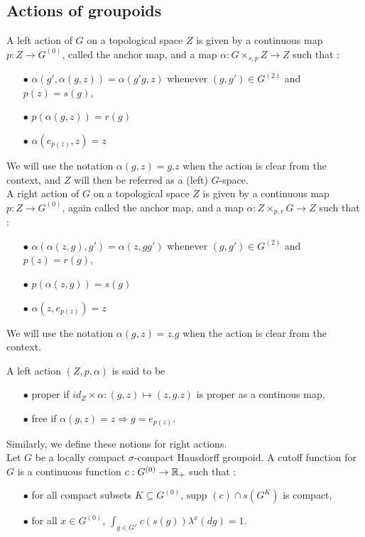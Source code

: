 \subsection{Actions of groupoids}

\begin{definition}
A left action of $G$ on a topological space $Z$ is given by a continuous map $p : Z \rightarrow G^{(0)}$, called the anchor map, and a map $\alpha : G\times_{s,p} Z \rightarrow Z $ such that :
\begin{itemize}
\item[$\bullet$] $\alpha(g',\alpha(g,z)) = \alpha(g'g,z)$ whenever $(g,g')\in G^{(2)}$ and $p(z)=s(g)$,
\item[$\bullet$] $p(\alpha(g,z))= r(g)$
\item[$\bullet$] $\alpha(e_{p(z)},z)=z$
\end{itemize} 
We will use the notation $\alpha(g,z) = g.z$ when the action is clear from the context, and $Z$ will then be referred as a (left) $G$-space.\\

A right action of $G$ on a topological space $Z$ is given by a continuous map $p : Z \rightarrow G^{(0)}$, again called the anchor map, and a map $\alpha : Z\times_{p,r} G \rightarrow Z $ such that :
\begin{itemize}
\item[$\bullet$] $\alpha(\alpha(z,g),g') = \alpha(z, gg')$ whenever $(g,g')\in G^{(2)}$ and $p(z)=r(g)$,
\item[$\bullet$] $p(\alpha(z,g))= s(g)$
\item[$\bullet$] $\alpha(z,e_{p(z)})=z$
\end{itemize} We will use the notation $\alpha(g,z) = z.g$ when the action is clear from the context.\\ 
\end{definition}

A left action $(Z,p,\alpha)$ is said to be 
\begin{itemize}
\item[$\bullet$] proper if $id_Z \times \alpha : (g,z) \mapsto (z,g.z) $ is proper as a continous map,
\item[$\bullet$] free if $\alpha(g,z)=z \Rightarrow g=e_{p(z)} $.
\end{itemize}
Similarly, we define these notions for right actions.\\

Let $G$ be a locally compact $\sigma$-compact Hausdorff groupoid. A cutoff function for $G$ is a continuous function $c : G^{(0)} \rightarrow \mathbb R_+$ such that :
\begin{itemize}
\item[$\bullet$] for all compact subsets $K\subseteq G^{(0)}$, $\text{supp }(c)\cap s(G^K)$ is compact,
\item[$\bullet$] for all $x\in G^{(0)}$, $\int_{g\in G^x} c(s(g)) \lambda^x(dg) = 1$.
\end{itemize}

